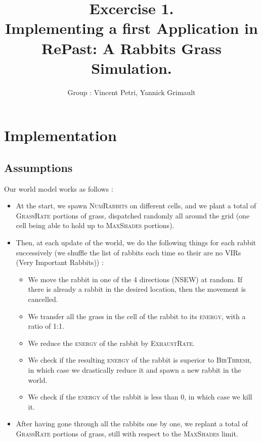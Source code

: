 \documentclass[11pt]{article}
\title{\bf Excercise 1.\\ Implementing a first Application in RePast: A Rabbits Grass Simulation.}
\author{Group \textnumero 3: Vincent Petri, Yannick Grimault}
\begin{document}
\maketitle

\section{Implementation}

\subsection{Assumptions}

Our world model works as follows :

\begin{itemize}
\item At the start, we spawn \textsc{NumRabbits} on different cells, and we plant a total of \textsc{GrassRate} portions of grass, dispatched randomly all around the grid (one cell being able to hold up to \textsc{MaxShades} portions).
\item Then, at each update of the world, we do the following things for each rabbit successively (we shuffle the list of rabbits each time so their are no VIRs (Very Important Rabbits)) :
\begin{itemize}
\item We move the rabbit in one of the 4 directions (NSEW) at random. If there is already a rabbit in the desired location, then the movement is cancelled.
\item We transfer all the grass in the cell of the rabbit to its \textsc{energy}, with a ratio of 1:1.
\item We reduce the \textsc{energy} of the rabbit by \textsc{ExhaustRate}.
\item We check if the resulting \textsc{energy} of the rabbit is superior to \textsc{BirThresh}, in which case we drastically reduce it and spawn a new rabbit in the world.
\item We check if the \textsc{energy} of the rabbit is less than 0, in which case we kill it.
\end{itemize}
\item After having gone through all the rabbits one by one, we replant a total of \textsc{GrassRate} portions of grass, still with respect to the \textsc{MaxShades} limit.
\end{itemize}
\end{document}
